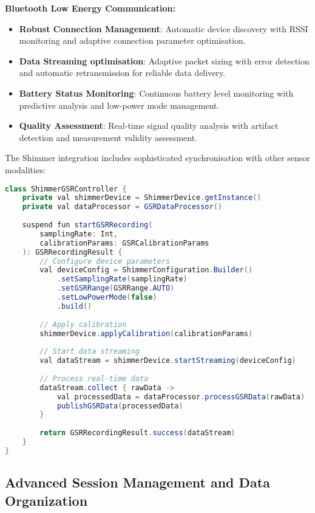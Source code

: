 \documentclass[11pt,a4paper]{report}
\begin{document}
\textbf{Bluetooth Low Energy Communication:}
\begin{itemize}
  \item \textbf{Robust Connection Management}: Automatic device discovery with RSSI monitoring and adaptive connection parameter optimisation.
  \item \textbf{Data Streaming optimisation}: Adaptive packet sizing with error detection and automatic retransmission for reliable data delivery.
  \item \textbf{Battery Status Monitoring}: Continuous battery level monitoring with predictive analysis and low-power mode management.
  \item \textbf{Quality Assessment}: Real-time signal quality analysis with artifact detection and measurement validity assessment.
\end{itemize}

The Shimmer integration includes sophisticated synchronisation with other sensor modalities:

\begin{lstlisting}[language=Java]
class ShimmerGSRController {
    private val shimmerDevice = ShimmerDevice.getInstance()
    private val dataProcessor = GSRDataProcessor()
    
    suspend fun startGSRRecording(
        samplingRate: Int,
        calibrationParams: GSRCalibrationParams
    ): GSRRecordingResult {
        // Configure device parameters
        val deviceConfig = ShimmerConfiguration.Builder()
            .setSamplingRate(samplingRate)
            .setGSRRange(GSRRange.AUTO)
            .setLowPowerMode(false)
            .build()
        
        // Apply calibration
        shimmerDevice.applyCalibration(calibrationParams)
        
        // Start data streaming
        val dataStream = shimmerDevice.startStreaming(deviceConfig)
        
        // Process real-time data
        dataStream.collect { rawData ->
            val processedData = dataProcessor.processGSRData(rawData)
            publishGSRData(processedData)
        }
        
        return GSRRecordingResult.success(dataStream)
    }
}
\end{lstlisting}

\subsection{Advanced Session Management and Data Organization}
\end{document}
